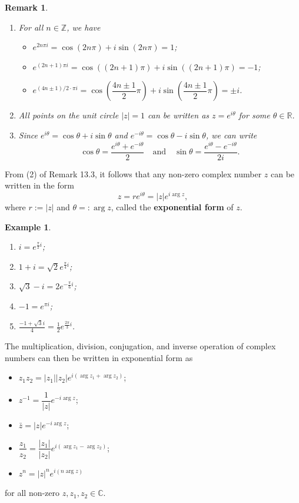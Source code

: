\documentclass[10pt]{article}
\newcommand{\R}{\mathbb{R}}
\newcommand{\C}{\mathbb{C}}
\newcommand{\Z}{\mathbb{Z}}
\theoremstyle{newstyle}
\newtheorem{remark}[thm]{Remark}
\newtheorem{exmp}[thm]{Example}
\begin{document}
\begin{remark}~
\begin{enumerate}[(1)]
    \item For all $n \in \Z$, we have 
    \begin{itemize}
        \item $e^{2n\pi i} = \cos(2n\pi) + i\sin(2n\pi) = 1$;
        \item $e^{(2n+1)\pi i} = \cos((2n+1)\pi) + i\sin((2n+1)\pi) = -1$;
        \item $e^{(4n\pm1)/2 \cdot \pi i} = \cos\left(\dfrac{4n\pm1}2\pi\right) + i\sin\left(\dfrac{4n\pm1}2\pi\right) = \pm i$.
    \end{itemize}
    \item All points on the unit circle $|z| = 1$ can be written as $z = e^{i\theta}$ for some $\theta \in \R$. 
    \item Since $e^{i\theta} = \cos\theta + i\sin\theta$ and $e^{-i\theta} = \cos\theta - i\sin\theta$, 
    we can write 
    \[ \cos\theta = \frac{e^{i\theta} + e^{-i\theta}}2 \quad \text{and} \quad 
    \sin\theta = \frac{e^{i\theta} - e^{-i\theta}}{2i}. \] 
\end{enumerate}
\end{remark}

From (2) of Remark 13.3, it follows that any non-zero complex number $z$ can be written in the form 
\[ z = re^{i\theta} = |z| e^{i\arg z}, \]
where $r := |z|$ and $\theta =: \arg z$, called the {\bf exponential form} of $z$. 

\begin{exmp}~
\begin{enumerate}[(1)]
    \item $i = e^{\frac\pi2i}$;
    \item $1+i = \sqrt2e^{\frac\pi4i}$;
    \item $\sqrt3 - i = 2e^{-\frac\pi6i}$;
    \item $-1 = e^{\pi i}$;
    \item $\frac{-1+\sqrt3i}4 = \frac12e^{\frac{2\pi}3i}$.
\end{enumerate}
\end{exmp}

The multiplication, division, conjugation, and inverse operation of complex numbers can then be 
written in exponential form as 
\begin{itemize}
    \item $z_1 z_2 = |z_1||z_2| e^{i(\arg z_1 + \arg z_2)}$;
    \item $z^{-1} = \dfrac{1}{|z|} e^{-i\arg z}$;
    \item $\bar{z} = |z| e^{-i\arg z}$;
    \item $\dfrac{z_1}{z_2} = \dfrac{|z_1|}{|z_2|} e^{i(\arg z_1 - \arg z_2)}$;
    \item $z^n = |z|^n e^{i(n \arg z)}$
\end{itemize}
for all non-zero $z, z_1, z_2 \in \C$.
\end{document}
